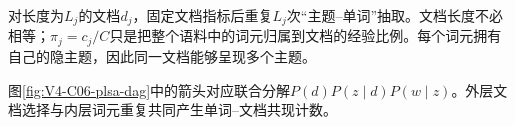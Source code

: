 \documentclass[UTF8,a4paper,11pt,openany]{ctexbook}
\begin{document}
\setcounter{page}{667}
\setcounter{chapter}{29}
\setcounter{figure}{0}
\pagestyle{headings}
对长度为$L_j$的文档$d_j$，固定文档指标后重复$L_j$次“主题--单词”抽取。文档长度不必相等；$\pi_j=c_j/C$只是把整个语料中的词元归属到文档的经验比例。每个词元拥有自己的隐主题，因此同一文档能够呈现多个主题。

图\ref{fig:V4-C06-plsa-dag}中的箭头对应联合分解$P(d)P(z\mid d)P(w\mid z)$。外层文档选择与内层词元重复共同产生单词--文档共现计数。
\end{document}
